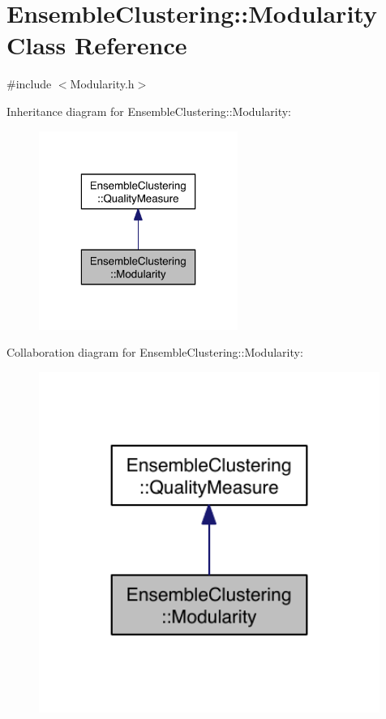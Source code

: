 \hypertarget{class_ensemble_clustering_1_1_modularity}{\section{Ensemble\-Clustering\-:\-:Modularity Class Reference}
\label{class_ensemble_clustering_1_1_modularity}
}


{\ttfamily \#include $<$Modularity.\-h$>$}



Inheritance diagram for Ensemble\-Clustering\-:\-:Modularity\-:
\nopagebreak
\begin{figure}[H]
\begin{center}
\leavevmode
\includegraphics[width=184pt]{class_ensemble_clustering_1_1_modularity__inherit__graph}
\end{center}
\end{figure}


Collaboration diagram for Ensemble\-Clustering\-:\-:Modularity\-:
\nopagebreak
\begin{figure}[H]
\begin{center}
\leavevmode
\includegraphics[width=315pt]{class_ensemble_clustering_1_1_modularity__coll__graph}
\end{center}
\end{figure}
